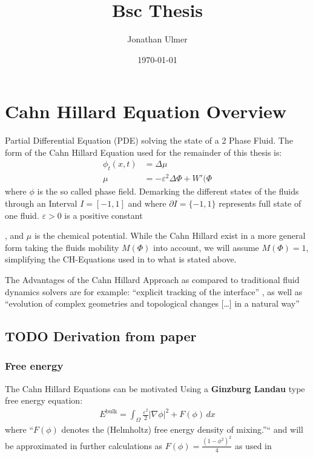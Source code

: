 \documentclass[11pt]{article}
\author{Jonathan Ulmer}
\date{\today}
\title{Bsc Thesis}
\begin{document}
\maketitle
\tableofcontents

\section{Cahn Hillard Equation Overview}
\label{sec:org845b36b}
Partial Differential Equation (PDE) solving the state of a 2 Phase Fluid\autocite{Wu_2022}. The form of the Cahn Hillard Equation used for the remainder of this thesis is:
\begin{align}
\phi _t(x,t) &=  \Delta  \mu \\
\mu &= - \varepsilon^2 \Delta \Phi  + W'(\Phi
\end{align}
where \(\phi\) is the so called phase field. Demarking the different states of the fluids through an Interval \(I=[-1,1]\) and where \(\partial I = \{-1,1\}\)  represents full state of one fluid. \(\varepsilon > 0\) is  a positive constant

, and \(\mu\) is the chemical potential\autocite{Wu_2022}. While the Cahn Hillard exist in a more general form taking the fluids mobility \(M(\Phi)\) into account, we will assume \(M(\Phi) = 1\), simplifying the CH-Equations used in\autocite{Wu_2022}\autocite{SHIN20117441} to what is stated above.


The Advantages of the Cahn Hillard Approach as compared to traditional fluid dynamics solvers are for example: ``explicit tracking of the interface'' \autocite{Wu_2022}, as well as ``evolution of complex geometries and topological changes [\ldots{}] in a natural way'' \autocite{Wu_2022}
\subsection{{\bfseries\sffamily TODO} Derivation from paper}
\label{sec:orgb96b734}
\subsubsection{Free energy}
\label{sec:org5257ed6}
The Cahn Hillard Equations can be motivated Using a \textbf{Ginzburg Landau} type free energy equation:
\begin{align*}
E^{\text{bulk}}  = \int_{  \Omega}  \frac{\varepsilon^2}{2} |\nabla \phi |^2 + F(\phi) \,dx
\end{align*}
where ``\(F(\phi)\)  denotes the (Helmholtz) free energy density of mixing.''`` \autocite{Wu_2022} and will be approximated in further calculations as \(F(\phi) = \frac{(1-\phi ^2)^2}{4}\) as used in\autocite{SHIN20117441}
\end{document}
